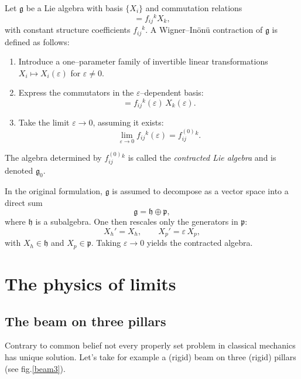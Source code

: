 Let $\mathfrak{g}$ be a Lie algebra with basis $\{X_i\}$ and commutation
relations
\begin{equation}
   [X_i,X_j] = f_{ij}{}^{k} X_k ,
\end{equation}
with constant structure coefficients $f_{ij}{}^{k}$.  A
Wigner--In\"on\"u contraction of $\mathfrak{g}$ is defined as follows:
\begin{enumerate}
\item Introduce a one--parameter family of invertible linear transformations
      $X_i \mapsto X_i(\varepsilon)$ for $\varepsilon \neq 0$.
\item Express the commutators in the $\varepsilon$--dependent basis:
\begin{equation}
    [X_i(\varepsilon),X_j(\varepsilon)]
        = f_{ij}{}^{k}(\varepsilon) \, X_k(\varepsilon).
\end{equation}
\item Take the limit $\varepsilon \to 0$, assuming it exists:
\begin{equation}
    \lim_{\varepsilon\to 0} f_{ij}{}^{k}(\varepsilon)
        = f^{(0)}_{ij}{}^{k}.
\end{equation}
\end{enumerate}
The algebra determined by $f^{(0)}_{ij}{}^{k}$ is called the
\emph{contracted Lie algebra} and is denoted $\mathfrak{g}_0$.

In the original formulation, $\mathfrak{g}$ is assumed to decompose as a vector
space into a direct sum
\begin{equation}
    \mathfrak{g} = \mathfrak{h} \oplus \mathfrak{p},
\end{equation}
where $\mathfrak{h}$ is a subalgebra.  One then rescales only the generators in
$\mathfrak{p}$:
\begin{equation}
   X_h' = X_h, \qquad
   X_p' = \varepsilon\, X_p,
\end{equation}
with $X_h \in \mathfrak{h}$ and $X_p \in \mathfrak{p}$.
Taking $\varepsilon \to 0$ yields the contracted algebra.

\section{The physics of limits}
\label{lm:ph}
\subsection{ The beam on three pillars}

Contrary to common belief not every properly set problem in
classical mechanics has unique solution. Let's take for example
a (rigid) beam on three (rigid) pillars (see fig.\ref{beam3}).

